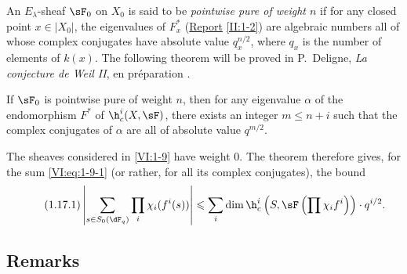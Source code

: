 An $E_\lambda$-sheaf $\sF_0$ on $X_0$ is said to be \emph{pointwise pure of 
weight $n$} if for any closed point $x\in |X_0|$, the eigenvalues of 
$F_x^\ast$ (\hyperref[II]{Report} \ref{II:1-2}) are algebraic numbers 
all of whose complex conjugates have absolute value 
$q_x^{n/2}$, where $q_x$ is the number of elements of $k(x)$. The 
following theorem will be proved in P.~Deligne, \emph{La conjecture de Weil II}, en préparation \cite{de80}. 





\begin{theorem_}\label{VI:1-17}
If $\sF_0$ is pointwise pure of weight $n$, then for any eigenvalue $\alpha$ 
of the endomorphism $F^\ast$ of $\h_c^i(X,\sF)$, there exists an integer 
$m\leqslant n+i$ such that the complex conjugates of $\alpha$ are all of 
absolute value $q^{m/2}$.
\end{theorem_}

The sheaves considered in \ref{VI:1-9} have weight $0$. The theorem 
therefore gives, for the sum \ref{VI:eq:1-9-1} (or rather, for all its 
complex conjugates), the bound 
\begin{equation*}\tag{1.17.1}\label{VI:eq:1-17-1}
  \left|\sum_{s\in S_0(\dF_q)} \prod_i \chi_i(f^i(s)) \right| \leqslant \sum_i \dim \h_c^i\left(S,\sF\left(\prod \chi_i f^i\right)\right)\cdot q^{i/2} \text{.}
\end{equation*}





\subsection{Remarks}\label{VI:1-18}


